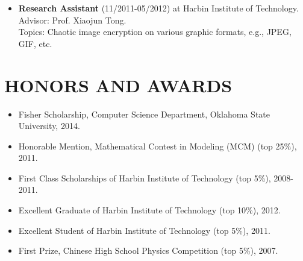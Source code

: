 \documentclass{article}
\begin{document}
\begin{itemize}
\item {\bf Research Assistant} (11/2011-05/2012) at Harbin Institute of Technology.\\
Advisor: Prof. Xiaojun Tong.\\
Topics: Chaotic image encryption on various graphic formats, e.g., JPEG, GIF, etc.
\end{itemize}

\section{\uppercase{Honors and Awards}}
\begin{itemize}
\item Fisher Scholarship, Computer Science Department, Oklahoma State University, 2014.
\item Honorable Mention, Mathematical Contest in Modeling (MCM) (top 25\%), 2011.
\item First Class Scholarships of Harbin Institute of Technology (top 5\%), 2008-2011.
\item Excellent Graduate of Harbin Institute of Technology (top 10\%), 2012.
\item Excellent Student of Harbin Institute of Technology (top 5\%), 2011.
\item First Prize, Chinese High School Physics Competition (top 5\%), 2007.
\end{itemize}
\end{document}
